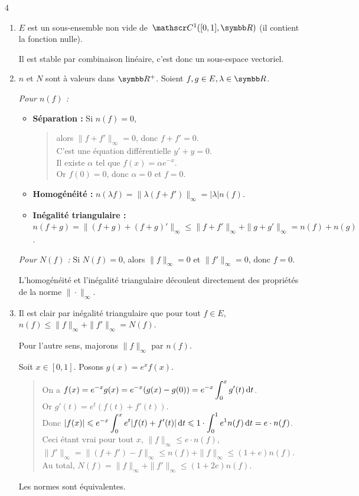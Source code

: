 \newpage
\begin{correction}{4}
\begin{enumerate}
    \item $E$ est un sous-ensemble non vide de $\mc 1([0,1], \R)$ (il contient la fonction nulle). 
    
    Il est stable par combinaison linéaire, c'est donc un sous-espace vectoriel.

    \item $n$ et $N$ sont à valeurs dans $\R^+$. Soient $f,g \in E, \lambda \in \R$.

    \textit{Pour $n(f)$ :}
    \begin{itemize}
        \item \textbf{Séparation :} Si $n(f)=0$,
        \begin{quote}
            alors $\|f+f'\|_\infty = 0$, donc $f+f'=0$. \\
            C'est une équation différentielle $y' + y = 0$. \\
            Il existe $\alpha$ tel que $f(x) = \alpha e^{-x}$. \\
            Or $f(0)=0$, donc $\alpha=0$ et $f=0$.
        \end{quote}
        \item \textbf{Homogénéité :} $n(\lambda f) = \|\lambda(f+f')\|_\infty = |\lambda| n(f)$.
        \item \textbf{Inégalité triangulaire :} $n(f+g) = \|(f+g) + (f+g)'\|_\infty \leqslant \|f+f'\|_\infty + \|g+g'\|_\infty = n(f) + n(g)$.
    \end{itemize}

    \textit{Pour $N(f)$ :}
    Si $N(f)=0$, alors $\|f\|_\infty = 0$ et $\|f'\|_\infty = 0$, donc $f=0$. 
    
    L'homogénéité et l'inégalité triangulaire découlent directement des propriétés de la norme $\|\cdot\|_\infty$.

    \item Il est clair par inégalité triangulaire que pour tout $f \in E$, $n(f) \leqslant \|f\|_\infty + \|f'\|_\infty = N(f)$.

    Pour l'autre sens, majorons $\|f\|_\infty$ par $n(f)$.
    
    Soit $x \in [0,1]$. Posons $g(x) = e^x f(x)$. 
    \begin{quote}
        On a $\displaystyle f(x) = e^{-x} g(x) = e^{-x} (g(x)-g(0)) = e^{-x} \int_0^x g'(t) \,\mathrm{d}t$. \\
        Or $g'(t) = e^t (f(t)+f'(t))$. \\
        Donc $\displaystyle |f(x)| \leqslant e^{-x} \int_0^x e^t |f(t)+f'(t)| \,\mathrm{d}t \leqslant 1 \cdot \int_0^1 e^1 n(f) \,\mathrm{d}t = e \cdot n(f)$. \\
        Ceci étant vrai pour tout $x$, $\|f\|_\infty \le e \cdot n(f)$,
        $\|f'\|_\infty = \|(f+f') - f\|_\infty \leqslant n(f) + \|f\|_\infty \leqslant (1+e)n(f)$. \\
        Au total, $N(f) = \|f\|_\infty + \|f'\|_\infty \leqslant (1+2e) n(f)$. 
    \end{quote}
    Les normes sont équivalentes.
\end{enumerate}
\end{correction}

